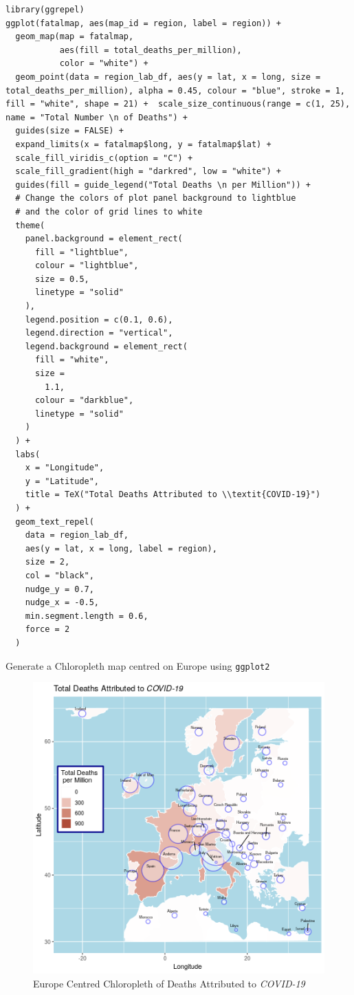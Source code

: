 \documentclass[11pt]{article}
\begin{document}
\begin{listing}[htbp]
\begin{verbatim}
library(ggrepel)
ggplot(fatalmap, aes(map_id = region, label = region)) +
  geom_map(map = fatalmap,
           aes(fill = total_deaths_per_million),
           color = "white") +
  geom_point(data = region_lab_df, aes(y = lat, x = long, size = total_deaths_per_million), alpha = 0.45, colour = "blue", stroke = 1, fill = "white", shape = 21) +  scale_size_continuous(range = c(1, 25), name = "Total Number \n of Deaths") +
  guides(size = FALSE) +
  expand_limits(x = fatalmap$long, y = fatalmap$lat) +
  scale_fill_viridis_c(option = "C") +
  scale_fill_gradient(high = "darkred", low = "white") +
  guides(fill = guide_legend("Total Deaths \n per Million")) +
  # Change the colors of plot panel background to lightblue
  # and the color of grid lines to white
  theme(
    panel.background = element_rect(
      fill = "lightblue",
      colour = "lightblue",
      size = 0.5,
      linetype = "solid"
    ),
    legend.position = c(0.1, 0.6),
    legend.direction = "vertical",
    legend.background = element_rect(
      fill = "white",
      size =
        1.1,
      colour = "darkblue",
      linetype = "solid"
    )
  ) +
  labs(
    x = "Longitude",
    y = "Latitude",
    title = TeX("Total Deaths Attributed to \\textit{COVID-19}")
  ) +
  geom_text_repel(
    data = region_lab_df,
    aes(y = lat, x = long, label = region),
    size = 2,
    col = "black",
    nudge_y = 0.7,
    nudge_x = -0.5,
    min.segment.length = 0.6,
    force = 2
  )
\end{verbatim}
\caption{\label{org4c7dcc7}Generate a Chloropleth map centred on Europe using \texttt{ggplot2}}
\end{listing}


\begin{figure}[htbp]
\centering
\includegraphics[width=16cm]{SecChEur.png}
\caption{\label{fig:orge496eef}Europe Centred Chloropleth of Deaths Attributed to \emph{COVID-19}}
\end{figure}
\end{document}
